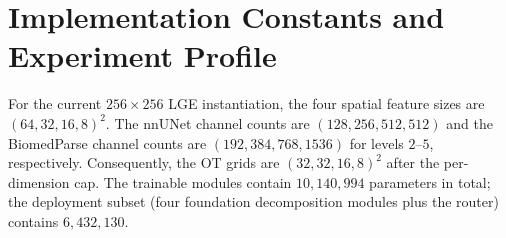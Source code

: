\documentclass[10pt]{article}
\begin{document}
\section{Implementation Constants and Experiment Profile}
For the current $256\times256$ LGE instantiation, the four spatial feature sizes
are $(64,32,16,8)^2$.  The nnUNet channel counts are
$(128,256,512,512)$ and the BiomedParse channel counts are
$(192,384,768,1536)$ for levels $2$--$5$, respectively.  Consequently, the OT
grids are $(32,32,16,8)^2$ after the per-dimension cap.  The trainable modules
contain $10{,}140{,}994$ parameters in total; the deployment subset (four
foundation decomposition modules plus the router) contains $6{,}432{,}130$.
\end{document}
